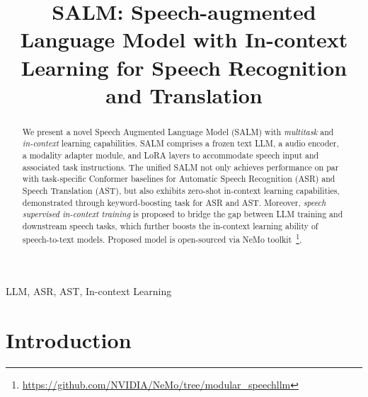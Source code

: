 \documentclass{article}
\title{SALM: Speech-augmented Language Model with In-context Learning for Speech Recognition and  Translation}
\begin{document}
\ninept
%
\maketitle
\begin{abstract}

We present a novel Speech Augmented Language Model (SALM) with {\em multitask} and {\em in-context} learning capabilities. SALM comprises a frozen text LLM, a audio encoder, a modality adapter module, and LoRA layers to accommodate speech input and associated task instructions. The unified SALM not only achieves performance on par with task-specific Conformer baselines for Automatic Speech Recognition (ASR) and Speech Translation (AST), but also exhibits zero-shot in-context learning capabilities, demonstrated through keyword-boosting task for ASR and AST. 
Moreover,  {\em speech supervised in-context training} is proposed to bridge the gap between LLM training and downstream speech tasks, which  further boosts the in-context learning  ability of speech-to-text models.
Proposed model is open-sourced via  NeMo toolkit~\footnote{\scriptsize\url{https://github.com/NVIDIA/NeMo/tree/modular_speechllm}}.


\end{abstract}
%
\begin{keywords}
LLM, ASR, AST, In-context Learning
\end{keywords}


\def\thefootnote{*}

\vspace{-1em}
\section{Introduction}
\label{sec:intro}
\vspace{-0.4em}
\end{document}
